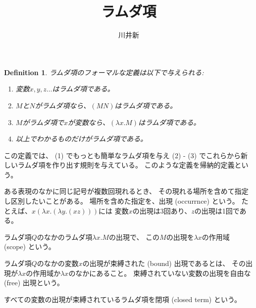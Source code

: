 \documentclass[fleqn]{jsarticle}
\title{ラムダ項}
\author{川井新}
\newtheorem{defi}{Definition}
\begin{document}
\maketitle


\begin{defi}
ラムダ項のフォーマルな定義は以下で与えられる:
  \begin{enumerate}
    \item 変数$x, y, z \ldots$はラムダ項である。
    \item $M$と$N$がラムダ項なら、$(MN)$はラムダ項である。
    \item $M$がラムダ項で$x$が変数なら、$(\lambda x. M)$はラムダ項である。
    \item 以上でわかるものだけがラムダ項である。
  \end{enumerate}
\end{defi}

この定義では、 (1) でもっとも簡単なラムダ項を与え
(2) - (3) でこれらから新しいラムダ項を作り出す規則を与えている。
このような定義を帰納的定義という。

ある表現のなかに同じ記号が複数回現れるとき、
その現れる場所を含めて指定し区別したいことがある。
場所を含めた指定を、出現 (occurrnce) という。
たとえば、$x (\lambda x .(\lambda y. (xz)))$には
変数$x$の出現は3回あり、$z$の出現は1回である。

ラムダ項$Q$のなかのラムダ項$\lambda x. M$の出現で、
この$M$の出現を$\lambda x$の作用域 (scope) という。

ラムダ項$Q$のなかの変数$x$の出現が束縛された (bound) 出現であるとは、
その出現が$\lambda x$の作用域か$\lambda x$のなかにあること。
束縛されていない変数の出現を自由な (free) 出現という。

すべての変数の出現が束縛されているラムダ項を閉項 (closed term) という。
\end{document}
